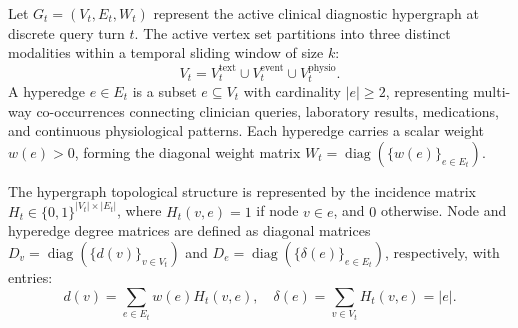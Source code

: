 \documentclass[ijds,dblanonrev]{informs4}
\DeclareMathOperator{\diag}{diag}
\begin{document}
Let $G_t = (V_t, E_t, W_t)$ represent the active clinical diagnostic hypergraph at discrete query turn $t$. The active vertex set partitions into three distinct modalities within a temporal sliding window of size $k$:
\begin{equation}
  V_t = V_t^{\text{text}} \cup V_t^{\text{event}} \cup V_t^{\text{physio}}.
  \label{eq:node_partition}
\end{equation}
A hyperedge $e \in E_t$ is a subset $e \subseteq V_t$ with cardinality $|e| \ge 2$, representing multi-way co-occurrences connecting clinician queries, laboratory results, medications, and continuous physiological patterns. Each hyperedge carries a scalar weight $w(e) > 0$, forming the diagonal weight matrix $W_t = \diag(\{w(e)\}_{e \in E_t})$.

The hypergraph topological structure is represented by the incidence matrix $H_t \in \{0, 1\}^{|V_t| \times |E_t|}$, where $H_t(v, e) = 1$ if node $v \in e$, and $0$ otherwise. Node and hyperedge degree matrices are defined as diagonal matrices $D_v = \diag(\{d(v)\}_{v \in V_t})$ and $D_e = \diag(\{\delta(e)\}_{e \in E_t})$, respectively, with entries:
\begin{equation}
  d(v) = \sum_{e \in E_t} w(e) H_t(v, e), \quad \delta(e) = \sum_{v \in V_t} H_t(v, e) = |e|.
  \label{eq:degrees}
\end{equation}
\end{document}

